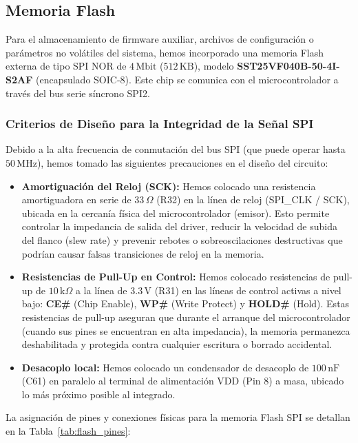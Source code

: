 \documentclass[12pt,a4paper]{article}
\begin{document}
\subsection{Memoria Flash}
Para el almacenamiento de firmware auxiliar, archivos de configuración o parámetros no volátiles del sistema, hemos incorporado una memoria Flash externa de tipo SPI NOR de $4\,\text{Mbit}$ ($512\,\text{KB}$), modelo \textbf{SST25VF040B-50-4I-S2AF} (encapsulado SOIC-8). Este chip se comunica con el microcontrolador a través del bus serie síncrono SPI2.

\subsubsection{Criterios de Diseño para la Integridad de la Señal SPI}
Debido a la alta frecuencia de conmutación del bus SPI (que puede operar hasta $50\,\text{MHz}$), hemos tomado las siguientes precauciones en el diseño del circuito:
\begin{itemize}
    \item \textbf{Amortiguación del Reloj (SCK):} Hemos colocado una resistencia amortiguadora en serie de $33\,\Omega$ (R32) en la línea de reloj (SPI\_CLK / SCK), ubicada en la cercanía física del microcontrolador (emisor). Esto permite controlar la impedancia de salida del driver, reducir la velocidad de subida del flanco (slew rate) y prevenir rebotes o sobreoscilaciones destructivas que podrían causar falsas transiciones de reloj en la memoria.
    \item \textbf{Resistencias de Pull-Up en Control:} Hemos colocado resistencias de pull-up de $10\,\text{k}\Omega$ a la línea de $3.3\,\text{V}$ (R31) en las líneas de control activas a nivel bajo: \textbf{CE\#} (Chip Enable), \textbf{WP\#} (Write Protect) y \textbf{HOLD\#} (Hold). Estas resistencias de pull-up aseguran que durante el arranque del microcontrolador (cuando sus pines se encuentran en alta impedancia), la memoria permanezca deshabilitada y protegida contra cualquier escritura o borrado accidental.
    \item \textbf{Desacoplo local:} Hemos colocado un condensador de desacoplo de $100\,\text{nF}$ (C61) en paralelo al terminal de alimentación VDD (Pin 8) a masa, ubicado lo más próximo posible al integrado.
\end{itemize}

La asignación de pines y conexiones físicas para la memoria Flash SPI se detallan en la Tabla~\ref{tab:flash_pines}:
\end{document}
